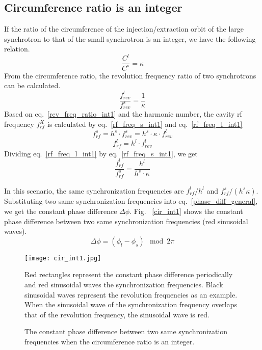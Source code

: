 \subsection{Circumference ratio is an integer}
\label{sec:cir_integer}
If the ratio of the circumference of the injection/extraction orbit of the large synchrotron to that of the small synchrotron is an integer, we have the following relation. 
\begin{equation}
\frac{C^l}{C^s}=\kappa \label{circumference_ratio_int1}
\end{equation}
From the circumference ratio, the revolution frequency ratio of two synchrotrons can be calculated.
\begin{equation}
\frac{f_{\mathit{rev}}^{l}}{f_{\mathit{rev}}^{s}}=\frac{1}{\kappa} \label{rev_freq_ratio_int1}
\end{equation}
Based on eq.~\ref{rev_freq_ratio_int1} and the harmonic number, the cavity rf frequency $f_{rf}^{X}$ is calculated by eq.~\ref{rf_freq_s_int1} and eq.~\ref{rf_freq_l_int1}
\begin{equation} 
f_{\mathit{rf}}^{s}= h^s \cdot f_{\mathit{rev}}^{s}=h^s \cdot \kappa \cdot f_{rev}^{l} \label{rf_freq_s_int1}
\end{equation}
\begin{equation} 
f_{\mathit{rf}}^{l}= h^l \cdot f_{\mathit{rev}}^{l} \label{rf_freq_l_int1}
\end{equation}
Dividing eq.~\ref{rf_freq_l_int1} by eq.~\ref{rf_freq_s_int1}, we get
\begin{equation} 
\frac{f_{\mathit{rf}}^{l}}{f_{\mathit{rf}}^{s}}= \frac{h^l}{h^s \cdot \kappa} \label{rf_freq_ratio1}
\end{equation}

In this scenario, the same synchronization frequencies are $f_{\mathit{rf}}^{l}/h^l $ and $f_{\mathit{rf}}^{s}/(h^{s}\kappa)$. Substituting two same synchronization frequencies into eq.~\ref{phase_diff_general}, we get the constant phase difference $\Delta \phi$. Fig. ~\ref{cir_int1} shows the constant phase difference between two same synchronization frequencies (red sinusoidal waves).
\begin{equation}
\label{phase_diff_cir_int}
	\Delta \phi=(\phi_l-\phi_s) \mod 2\pi
\end{equation}

\begin{figure}[!htb]
   \centering   
   \texttt{[image: cir\_int1.jpg]}
   \caption{The constant phase difference between two same synchronization frequencies when the circumference ratio is an integer.}{Red rectangles represent the constant phase difference periodically and red sinusoidal waves the synchronization frequencies. Black sinusoidal waves represent the revolution frequencies as an example. When the sinusoidal wave of the synchronization frequency overlaps that of the revolution frequency, the sinusoidal wave is red.}
   \label{cir_int}
\end{figure} 

